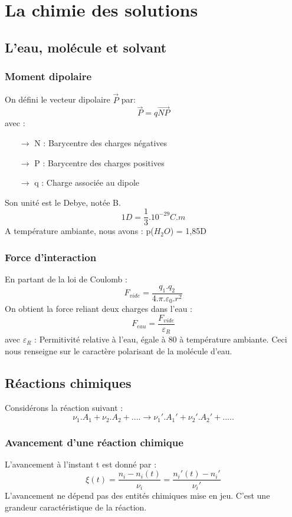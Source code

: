 
\chapter{La chimie des solutions}
\section{L'eau, molécule et solvant}
\subsection{Moment dipolaire}
\begin{de}
On défini le vecteur dipolaire $\overrightarrow{P}$ par:
$$\overrightarrow{P} = q\overrightarrow{NP}$$
avec :
\begin{itemize}
 \item[$\rightarrow$] N : Barycentre des charges négatives
 \item[$\rightarrow$] P : Barycentre des charges positives
 \item[$\rightarrow$] q : Charge associée au dipole
\end{itemize}
Son unité est le Debye, notée B.
$$1D = \dfrac{1}{3}.10^{-29}C.m$$
A température ambiante, nous avons : p($H_2O$) = 1,85D
\end{de}
\subsection{Force d'interaction}
En partant de la loi de Coulomb : 
$$F_{vide} = \dfrac{q_1.q_2}{4.\pi.\varepsilon_0.r^2}$$
On obtient la force reliant deux charges dans l'eau :
$$F_{eau} = \dfrac{F_{vide}}{\varepsilon_R}$$
avec $\varepsilon_R$ : Permitivité relative à l'eau, égale à 80 à température ambiante. Ceci nous renseigne sur le caractère polarisant de la molécule d'eau.
\section{Réactions chimiques}
Considérons la réaction suivant :
$$\nu_1.A_1 + \nu_2.A_2 + .... \rightarrow \nu_1'.A_1' + \nu_2'.A_2' + .....$$
\subsection{Avancement d'une réaction chimique}
\begin{de}
L'avancement à l'instant t est donné par :
$$\xi(t) = \dfrac{n_i - n_i(t)}{\nu_i} = \dfrac{n_i'(t) - n_i'}{\nu_i'} $$
L'avancement ne dépend pas des entités chimiques mise en jeu. C'est une grandeur caractéristique de la réaction.
\end{de}
